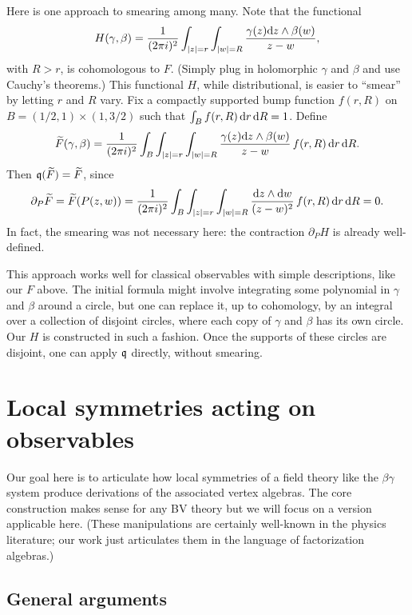 Here is one approach to smearing among many.
Note that the functional
\[
H(\gamma,\beta) = \frac{1}{(2\pi i)^2} \int_{|z| = r} \int_{|w| = R} \frac{\gamma(z) {\rm d} z \wedge \beta(w)}{z-w},
\]
with $R > r$, is cohomologous to $F$.
(Simply plug in holomorphic $\gamma$ and $\beta$ and use Cauchy's theorems.)
This functional $H$, while distributional, is easier to ``smear''
by letting $r$ and $R$ vary.
Fix a compactly supported bump function $f(r,R)$ on $B = (1/2,1) \times (1,3/2)$ such that $\int_B f(r,R) \,{\rm d} r \, {\rm d} R = 1$.
Define
\[
\widetilde{F}(\gamma,\beta) = 
\frac{1}{(2\pi i)^2} \int_B  \int_{|z| = r} \int_{|w| = R} \frac{\gamma(z) {\rm d} z \wedge \beta(w)}{z-w}\, f(r,R) \,{\rm d} r \, {\rm d} R.
\]
Then $\frak{q}(\widetilde{F}) = \widetilde{F}$, since 
\[
\partial_P \widetilde{F} = \widetilde{F}(P(z,w)) = \frac{1}{(2\pi i)^2} \int_B  \int_{|z| = r} \int_{|w| = R} \frac{{\rm d} z \wedge {\rm d} w}{(z-w)^2}\, f(r,R) \,{\rm d} r \, {\rm d} R = 0.
\]
In fact, the smearing was not necessary here: the contraction $\partial_P H$ is already well-defined.

\begin{rmk}
\label{promotion}
This approach works well for classical observables with simple descriptions, like our $F$ above.
The initial formula might involve integrating some polynomial in $\gamma$ and $\beta$ around a circle,
but one can replace it, up to cohomology, by an integral over a collection of disjoint circles,
where each copy of $\gamma$ and $\beta$ has its own circle.
Our $H$ is constructed in such a fashion.
Once the supports of these circles are disjoint, 
one can apply $\frak{q}$ directly, without smearing.
\end{rmk}

\section{Local symmetries acting on observables}
\label{sec loc sym}

Our goal here is to articulate how local symmetries of a field theory like the $\beta\gamma$ system
produce derivations of the associated vertex algebras. 
The core construction makes sense for any BV theory 
but we will focus on a version applicable here.
(These manipulations are certainly well-known in the physics literature; 
our work just articulates them in the language of factorization algebras.)

\subsection{General arguments}

